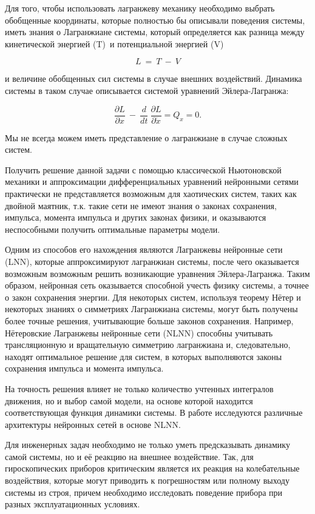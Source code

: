 \documentclass[12pt, twoside]{article}
\begin{document}
Для того, чтобы использовать лагранжеву механику необходимо выбрать обобщенные координаты, которые полностью бы описывали поведения системы, иметь знания о Лагранжиане системы, который определяется как разница между кинетической энергией (T)\ и потенциальной энергией (V) 

\[L\ =\ T\ -\ V\]

\noindent
и величине обобщенных сил системы в случае внешних воздействий.
Динамика системы в таком случае описывается системой уравнений Эйлера-Лагранжа:

\[ \frac{\partial L}{\partial x}\ -\ \frac{d}{dt}\ \frac{\partial L}{\partial\dot{x}}=Q_x=0.\]

\noindent
Мы не всегда можем иметь представление о лагранжиане в случае сложных систем. 

 Получить решение данной задачи с помощью классической Ньютоновской механики и аппроксимации дифференциальных уравнений нейронными сетями практически не представляется возможным для хаотических систем, таких как двойной маятник, т.к. такие сети не имеют знания о законах сохранения, импульса, момента импульса и других законах физики, и оказываются неспособными получить оптимальные параметры модели. 
 
Одним из способов его нахождения являются Лагранжевы нейронные сети (LNN), которые аппроксимируют лагранжиан системы, после чего оказывается возможным возможным решить возникающие уравнения Эйлера-Лагранжа. Таким образом, нейронная сеть оказывается способной учесть физику системы, а точнее о закон сохранения энергии. Для некоторых систем, используя теорему Нётер и некоторых знаниях о симметриях Лагранжиана системы, могут быть получены более точные решения, учитывающие больше законов сохранения. Например, Нётеровские Лагранжевы нейронные сети (NLNN) способны учитывать трансляционную и вращательную симметрию лагранжиана и, следовательно, находят оптимальное решение для систем, в которых выполняются законы сохранения импульса и момента импульса.

На точность решения влияет не только количество учтенных интегралов движения, но и выбор самой модели, на основе которой находится соответствующая функция динамики системы. В работе исследуются различные архитектуры нейронных сетей в основе NLNN.

Для инженерных задач необходимо не только уметь предсказывать динамику самой системы, но и её реакцию на внешнее воздействие. Так, для гироскопических приборов критическим является их реакция на колебательные воздействия, которые могут приводить к погрешностям или полному выходу системы из строя, причем необходимо исследовать поведение прибора при разных эксплуатационных условиях.
\end{document}
